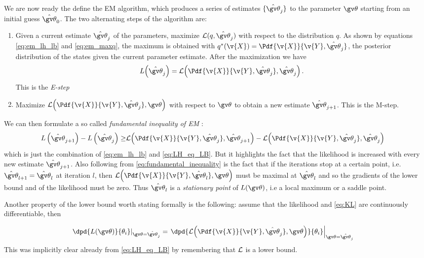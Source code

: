 We are now ready the define the EM algorithm, which produces
a series of estimates $\{\hat{\Th}_j\}$ to the parameter $\Th$
starting from an initial guess $\hat{\Th}_0$. The two alternating
steps of the algorithm are:

\begin{enumerate}
  \item Given a current estimate $\hat{\Th}_j$ of the parameters, maximize
  $\LB(q,\hat{\Th}_j)$ with respect to the distribution $q$. As shown by equations 
  \eqref{eq:em_lh_lb} and \eqref{eq:em_maxq}, the maximum is obtained with 
  $q^*(\v{X}) = \Pdf{\v{X}}{\v{Y},\hat{\Th}_j}$, the posterior
  distribution of the states given the current parameter estimate. After the maximization
  we have
  	\begin{align}
  		L\!\left(\hat{\Th}_j\right)=\LB\!\left(\Pdf{\v{X}}{\v{Y},\hat{\Th}_j},\hat{\Th}_j\right).  
		\label{eq:LH_eq_LB}
	\end{align}
	This is the \emph{E-step} 
  \item Maximize $\LB\!\left(\Pdf{\v{X}}{\v{Y},\hat{\Th}_j},\Th\right)$ with respect
  to $\Th$ to obtain a new estimate $\hat{\Th}_{j+1}$. This is the M-step.
\end{enumerate}
We can then formulate a so called \emph{fundamental inequality of EM} \parencite{Cappe2005}:
\begin{align}
	L\left(\hat{\Th}_{j+1}\right) - L\left(\hat{\Th}_j\right)\geq & \LB\!\left(\Pdf{\v{X}}{\v{Y},\hat{\Th}_j},\hat{\Th}_{j+1}\right) - \LB\!\left(\Pdf{\v{X}}{\v{Y},\hat{\Th}_j},\hat{\Th}_{j}\right) 
	\label{eq:fundamental_inequality}
\end{align}
which is just the combination of \eqref{eq:em_lh_lb} and \eqref{eq:LH_eq_LB}. But it highlights
the fact that the likelihood is increased with every new estimate $\hat{\Th}_{j+1}$.
Also following from \eqref{eq:fundamental_inequality} is the fact that if the iterations
stop at a certain point, i.e. $\hat{\Th}_{l+1}=\hat{\Th}_l$ at iteration $l$, then
$\LB\!\left(\Pdf{\v{X}}{\v{Y},\hat{\Th}_l},\Th\right)$ must be maximal at $\hat{\Th}_l$
and so the gradients of the lower bound and of the likelihood must be zero. Thus
$\hat{\Th}_l$ is a \emph{stationary point} of $L(\Th)$, i.e a local maximum or a saddle point.



Another property of the lower bound worth stating formally is the following: assume that
the likelihood and \eqref{eq:KL} are continuously differentiable, then

\begin{align}
		\left.\dpd{\lLH}{\theta_i}\right|_{\Th=\hat{\Th}_j}&=\left.\dpd{\LB\!\left(\Pdf{\v{X}}{\v{Y},\hat{\Th}_j},\Th\right)}{\theta_i}\right|_{\Th=\hat{\Th}_j} \label{eq:EM_gradients}
\end{align}
This was implicitly clear already from \eqref{eq:LH_eq_LB} by remembering that $\mathcal{L}$ is a lower
bound.

